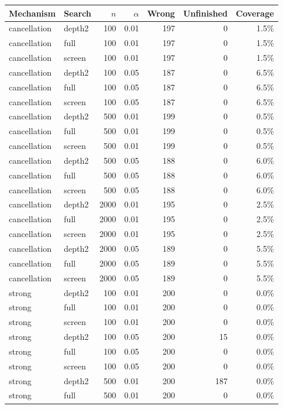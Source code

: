 \begingroup\small
\begin{longtable}{llrrrrr}
\toprule
Mechanism & Search & $n$ & $\alpha$ & Wrong & Unfinished & Coverage\\
\midrule\endhead
cancellation & depth2 & 100 & 0.01 & 197 & 0 & 1.5\%\\
cancellation & full & 100 & 0.01 & 197 & 0 & 1.5\%\\
cancellation & screen & 100 & 0.01 & 197 & 0 & 1.5\%\\
cancellation & depth2 & 100 & 0.05 & 187 & 0 & 6.5\%\\
cancellation & full & 100 & 0.05 & 187 & 0 & 6.5\%\\
cancellation & screen & 100 & 0.05 & 187 & 0 & 6.5\%\\
cancellation & depth2 & 500 & 0.01 & 199 & 0 & 0.5\%\\
cancellation & full & 500 & 0.01 & 199 & 0 & 0.5\%\\
cancellation & screen & 500 & 0.01 & 199 & 0 & 0.5\%\\
cancellation & depth2 & 500 & 0.05 & 188 & 0 & 6.0\%\\
cancellation & full & 500 & 0.05 & 188 & 0 & 6.0\%\\
cancellation & screen & 500 & 0.05 & 188 & 0 & 6.0\%\\
cancellation & depth2 & 2000 & 0.01 & 195 & 0 & 2.5\%\\
cancellation & full & 2000 & 0.01 & 195 & 0 & 2.5\%\\
cancellation & screen & 2000 & 0.01 & 195 & 0 & 2.5\%\\
cancellation & depth2 & 2000 & 0.05 & 189 & 0 & 5.5\%\\
cancellation & full & 2000 & 0.05 & 189 & 0 & 5.5\%\\
cancellation & screen & 2000 & 0.05 & 189 & 0 & 5.5\%\\
strong & depth2 & 100 & 0.01 & 200 & 0 & 0.0\%\\
strong & full & 100 & 0.01 & 200 & 0 & 0.0\%\\
strong & screen & 100 & 0.01 & 200 & 0 & 0.0\%\\
strong & depth2 & 100 & 0.05 & 200 & 15 & 0.0\%\\
strong & full & 100 & 0.05 & 200 & 0 & 0.0\%\\
strong & screen & 100 & 0.05 & 200 & 0 & 0.0\%\\
strong & depth2 & 500 & 0.01 & 200 & 187 & 0.0\%\\
strong & full & 500 & 0.01 & 200 & 0 & 0.0\%\\

\end{longtable}
